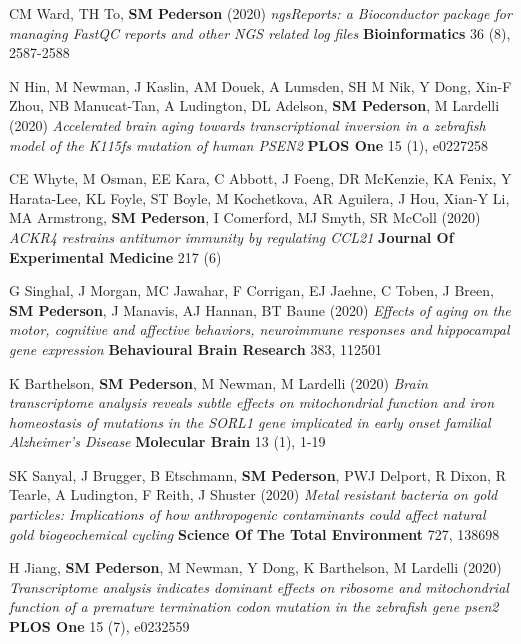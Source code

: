 \documentclass[11pt,a4paper,]{moderncv}
\begin{document}
\begin{modenumerate}
  \small
     \moditem{*} CM Ward, TH To, \textbf{SM Pederson} (2020) \emph{ngsReports: a Bioconductor package for managing FastQC reports and other NGS related log files} \textbf{Bioinformatics} 36 (8), 2587-2588 \\[-4mm] 
     \item N Hin, M Newman, J Kaslin, AM Douek, A Lumsden, SH M Nik, Y Dong, Xin-F Zhou, NB Manucat-Tan, A Ludington, DL Adelson, \textbf{SM Pederson}, M Lardelli (2020) \emph{Accelerated brain aging towards transcriptional inversion in a zebrafish model of the K115fs mutation of human PSEN2} \textbf{PLOS One} 15 (1), e0227258 \\[-4mm] 
     \item CE Whyte, M Osman, EE Kara, C Abbott, J Foeng, DR McKenzie, KA Fenix, Y Harata-Lee, KL Foyle, ST Boyle, M Kochetkova, AR Aguilera, J Hou, Xian-Y Li, MA Armstrong, \textbf{SM Pederson}, I Comerford, MJ Smyth, SR McColl (2020) \emph{ACKR4 restrains antitumor immunity by regulating CCL21} \textbf{Journal Of Experimental Medicine} 217 (6) \\[-4mm] 
     \item G Singhal, J Morgan, MC Jawahar, F Corrigan, EJ Jaehne, C Toben, J Breen, \textbf{SM Pederson}, J Manavis, AJ Hannan, BT Baune (2020) \emph{Effects of aging on the motor, cognitive and affective behaviors, neuroimmune responses and hippocampal gene expression} \textbf{Behavioural Brain Research} 383, 112501 \\[-4mm] 
     \item K Barthelson, \textbf{SM Pederson}, M Newman, M Lardelli (2020) \emph{Brain transcriptome analysis reveals subtle effects on mitochondrial function and iron homeostasis of mutations in the SORL1 gene implicated in early onset familial Alzheimer's Disease} \textbf{Molecular Brain} 13 (1), 1-19 \\[-4mm] 
     \item SK Sanyal, J Brugger, B Etschmann, \textbf{SM Pederson}, PWJ Delport, R Dixon, R Tearle, A Ludington, F Reith, J Shuster (2020) \emph{Metal resistant bacteria on gold particles: Implications of how anthropogenic contaminants could affect natural gold biogeochemical cycling} \textbf{Science Of The Total Environment} 727, 138698 \\[-4mm] 
     \item H Jiang, \textbf{SM Pederson}, M Newman, Y Dong, K Barthelson, M Lardelli (2020) \emph{Transcriptome analysis indicates dominant effects on ribosome and mitochondrial function of a premature termination codon mutation in the zebrafish gene psen2} \textbf{PLOS One} 15 (7), e0232559 \\[-4mm] 

\end{modenumerate}
\end{document}
